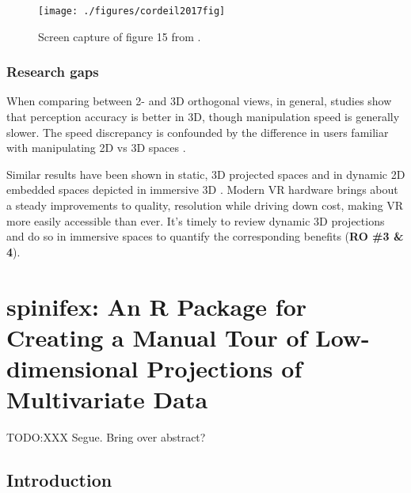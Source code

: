 \documentclass{template/monashthesis}
\begin{document}
\begin{figure}

{\centering \texttt{[image: ./figures/cordeil2017fig]} 

}

\caption{Screen capture of figure 15 from \textcite{cordeil_imaxes:_2017}.}\label{fig:cordeil2017fig}
\end{figure}

\hypertarget{research-gaps-1}{%
\subsection{Research gaps}\label{research-gaps-1}}

When comparing between 2- and 3D orthogonal views, in general, studies show that perception accuracy is better in 3D, though manipulation speed is generally slower. The speed discrepancy is confounded by the difference in users familiar with manipulating 2D vs 3D spaces \autocites{lee_effects_1986,wickens_implications_1994,tory_visualization_2006}[counterexample][]{sedlmair_empirical_2013}.

Similar results have been shown in static, 3D projected spaces \autocite{gracia_new_2016,wagner_filho_immersive_2018} and in dynamic 2D embedded spaces depicted in immersive 3D \autocite{nelson_xgobi_1998}. Modern VR hardware brings about a steady improvements to quality, resolution while driving down cost, making VR more easily accessible than ever. It's timely to review dynamic 3D projections and do so in immersive spaces to quantify the corresponding benefits (\textbf{RO \#3 \& 4}).

\hypertarget{ch:spinifex}{%
\chapter{spinifex: An R Package for Creating a Manual Tour of Low-dimensional Projections of Multivariate Data}\label{ch:spinifex}}

TODO:XXX Segue. Bring over abstract?

\hypertarget{introduction}{%
\section{Introduction}\label{introduction}}
\end{document}
